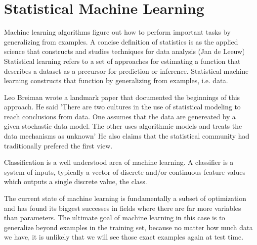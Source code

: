 

\section{Statistical Machine Learning}

Machine learning algorithms figure out how to perform important tasks by generalizing from examples. A concise definition of statistics is as the applied science that constructs and studies techniques for data analysis (Jan de Leeuw) Statistical learning refers to a set of approaches for estimating a function that describes a dataset as a precursor for prediction or inference.\cite{James2013} Statistical machine learning constructs that function by generalizing from examples, i.e. data.

Leo Breiman wrote a landmark paper that documented the beginnings of this approach. He said 'There are two cultures in the use of statistical modeling to reach conclusions from data. One assumes that the data are genereated by a given stochastic data model. The other uses algorithmic models and treats the data mechanisms as unknown' \cite{Breiman2001} He also claims that the statistical community had traditionally prefered the first view.

Classification is a well understood area of machine learning. A classifier is a system of inputs, typically a vector of discrete and/or continuous feature values which outputs a single discrete value, the class.\cite{Domingos2012}

The current state of machine learning is fundamentally a subset of optimization and has found its biggest successes in fields where there are far more variables than parameters. The ultimate goal of machine learning in this case is to generalize beyond examples in the training set, because no matter how much data we have, it is unlikely that we will see those exact examples again at test time.\cite{Domingos2012} 


